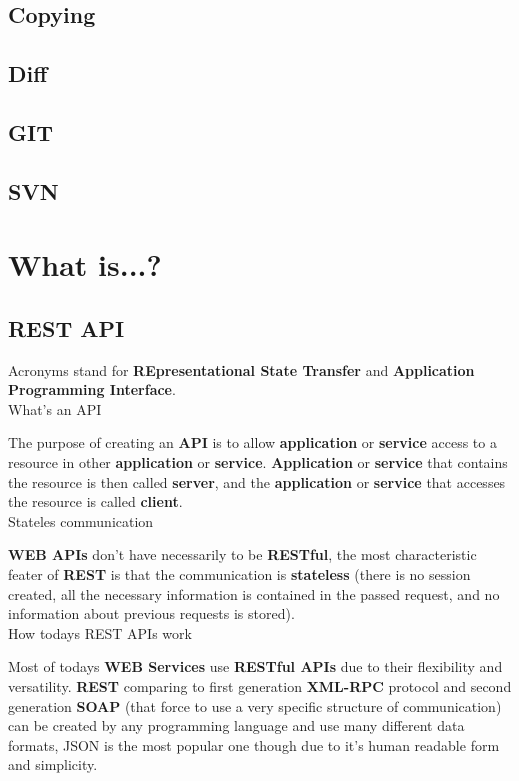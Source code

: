 \section{Copying}

\section{Diff}

\section{GIT}

\section{SVN}

\chapter{What is...?}

\section{REST API}


Acronyms stand for \textbf{REpresentational State Transfer} and \textbf{Application Programming Interface}.\\

What's an API

The purpose of creating an \textbf{API} is to allow \textbf{application} or \textbf{service} access to a resource in other \textbf{application} or \textbf{service}. \textbf{Application} or \textbf{service }that contains the resource is then called \textbf{server}, and the \textbf{application} or \textbf{service} that accesses the resource is called \textbf{client}.\\

Stateles communication

\textbf{WEB APIs} don't have necessarily to be \textbf{RESTful}, the most characteristic feater of \textbf{REST} is that the communication is \textbf{stateless} (there is no session created, all the necessary information is contained in the passed request, and no information about previous requests is stored).\\

How todays REST APIs work

Most of todays \textbf{WEB Services} use \textbf{RESTful APIs} due to their flexibility and versatility. \textbf{REST} comparing to first generation \textbf{XML-RPC} protocol and second generation \textbf{SOAP} (that force to use a very specific structure of communication)	can be created by any programming language and use many different data formats, JSON is the most popular one though due to it's human readable form and simplicity.\\

